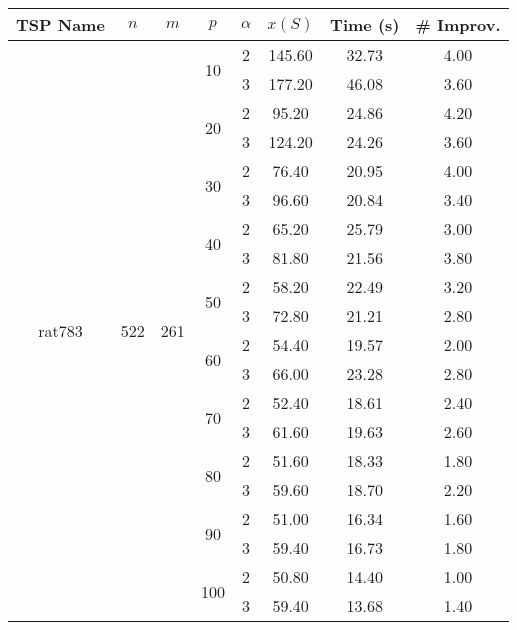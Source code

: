 \begin{tabular}{|ccccc|ccc|}
\toprule
       TSP Name & $n$ & $m$ & $p$ & $\alpha$   & $x(S)$ &  Time (s) &  \# Improv. \\
\midrule
\multirow{20}{*}{rat783} & \multirow{20}{*}{522} & \multirow{20}{*}{261} & \multirow{2}{*}{10} & 2 & 145.60 & 32.73 &     4.00 \\
       &     &     &     & 3 & 177.20 & 46.08 &     3.60 \\
\cline{4-8}
       &     &     & \multirow{2}{*}{20} & 2 &  95.20 & 24.86 &     4.20 \\
       &     &     &     & 3 & 124.20 & 24.26 &     3.60 \\
\cline{4-8}
       &     &     & \multirow{2}{*}{30} & 2 &  76.40 & 20.95 &     4.00 \\
       &     &     &     & 3 &  96.60 & 20.84 &     3.40 \\
\cline{4-8}
       &     &     & \multirow{2}{*}{40} & 2 &  65.20 & 25.79 &     3.00 \\
       &     &     &     & 3 &  81.80 & 21.56 &     3.80 \\
\cline{4-8}
       &     &     & \multirow{2}{*}{50} & 2 &  58.20 & 22.49 &     3.20 \\
       &     &     &     & 3 &  72.80 & 21.21 &     2.80 \\
\cline{4-8}
       &     &     & \multirow{2}{*}{60} & 2 &  54.40 & 19.57 &     2.00 \\
       &     &     &     & 3 &  66.00 & 23.28 &     2.80 \\
\cline{4-8}
       &     &     & \multirow{2}{*}{70} & 2 &  52.40 & 18.61 &     2.40 \\
       &     &     &     & 3 &  61.60 & 19.63 &     2.60 \\
\cline{4-8}
       &     &     & \multirow{2}{*}{80} & 2 &  51.60 & 18.33 &     1.80 \\
       &     &     &     & 3 &  59.60 & 18.70 &     2.20 \\
\cline{4-8}
       &     &     & \multirow{2}{*}{90} & 2 &  51.00 & 16.34 &     1.60 \\
       &     &     &     & 3 &  59.40 & 16.73 &     1.80 \\
\cline{4-8}
       &     &     & \multirow{2}{*}{100} & 2 &  50.80 & 14.40 &     1.00 \\
       &     &     &     & 3 &  59.40 & 13.68 &     1.40 \\
\bottomrule
\end{tabular}
